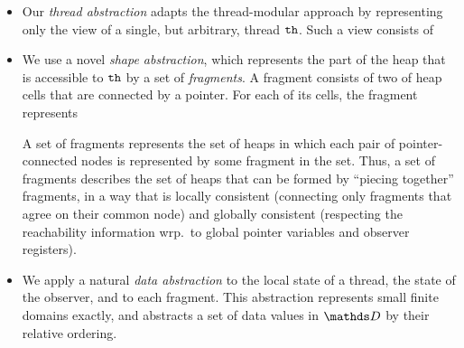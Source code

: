 \begin{itemize}
  \item
Our {\em thread abstraction}
adapts the thread-modular approach by representing only the view of a single, but arbitrary, thread ${\tt th}$. Such a view consists of
\item
We use a novel {\em shape abstraction}, which represents the part of the heap
that is accessible to ${\tt th}$ by a set of {\em fragments}. 
A fragment consists of two of heap cells that are connected by a pointer.
For each of its cells, the fragment represents
A set of fragments represents the set of heaps 
in which each pair of pointer-connected nodes is represented by some
fragment in the set.
Thus, a set of fragments describes the set of heaps
that can be formed by ``piecing together'' fragments, in a way that is
locally consistent (connecting only fragments that agree on their
common node) and globally consistent (respecting the reachability
information wrp.\ to global pointer variables and observer registers).
\item
We apply a natural {\em data abstraction} to the local state of a thread, the
state of the observer, and to each fragment. This abstraction
represents small finite domains exactly, and abstracts a set of
data values in $\ddomain$ by their relative ordering.
\end{itemize}

